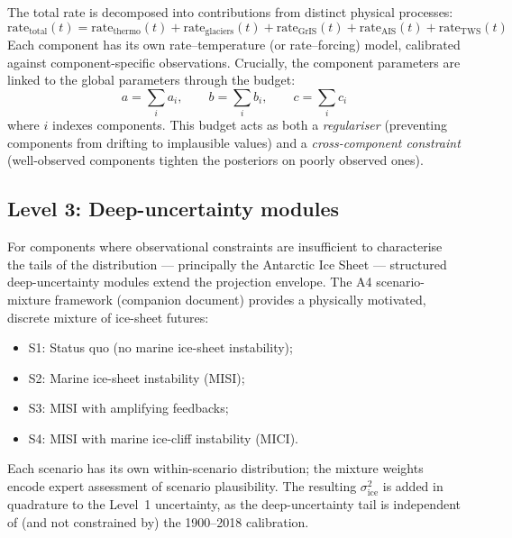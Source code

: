 \documentclass[11pt]{article}
\begin{document}
The total rate is decomposed into contributions from distinct physical processes:
\begin{equation}
  \text{rate}_{\text{total}}(t) = \text{rate}_{\text{thermo}}(t)
    + \text{rate}_{\text{glaciers}}(t)
    + \text{rate}_{\text{GrIS}}(t)
    + \text{rate}_{\text{AIS}}(t)
    + \text{rate}_{\text{TWS}}(t)
  \label{eq:budget}
\end{equation}
Each component has its own rate--temperature (or rate--forcing) model, calibrated against component-specific observations.  Crucially, the component parameters are linked to the global parameters through the budget:
\begin{equation}
  a = \sum_i a_i, \qquad b = \sum_i b_i, \qquad c = \sum_i c_i
  \label{eq:coefficient-budget}
\end{equation}
where $i$ indexes components.  This budget acts as both a \emph{regulariser} (preventing components from drifting to implausible values) and a \emph{cross-component constraint} (well-observed components tighten the posteriors on poorly observed ones).

\subsection{Level 3: Deep-uncertainty modules}

For components where observational constraints are insufficient to characterise the tails of the distribution --- principally the Antarctic Ice Sheet --- structured deep-uncertainty modules extend the projection envelope.  The A4 scenario-mixture framework (companion document) provides a physically motivated, discrete mixture of ice-sheet futures:
\begin{itemize}
  \item S1: Status quo (no marine ice-sheet instability);
  \item S2: Marine ice-sheet instability (MISI);
  \item S3: MISI with amplifying feedbacks;
  \item S4: MISI with marine ice-cliff instability (MICI).
\end{itemize}
Each scenario has its own within-scenario distribution; the mixture weights encode expert assessment of scenario plausibility.  The resulting $\sigma_{\text{ice}}^2$ is added in quadrature to the Level~1 uncertainty, as the deep-uncertainty tail is independent of (and not constrained by) the 1900--2018 calibration.


\end{document}
